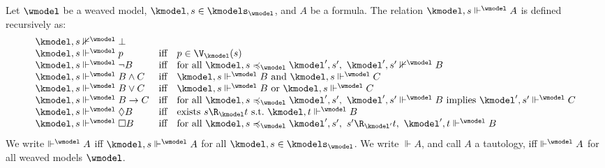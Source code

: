 {

\begin{definition}\label{def:sat:wmodel:simulation}
  Let $\wmodel$ be a weaved model, $\kmodel,s \in \kmodels_{\wmodel}$, and $A$ be a formula.
  The relation $\kmodel, s \Vdash^{\wmodel} A$ is defined recursively as:
  \[\begin{array}{lcl}
    \kmodel, s \nVdash^{\wmodel} \bot \\
    \kmodel, s \Vdash^{\wmodel} p & \text{iff} & p \in \V_{\kmodel}(s) \\
    \kmodel, s \Vdash^{\wmodel} \lnot B & \text{iff} & \text{for all } \kmodel,s \preccurlyeq_{\wmodel} \kmodel',s',~ \kmodel', s' \nVdash^{\wmodel} B \\
    \kmodel, s \Vdash^{\wmodel} B \land C & \text{iff} & \kmodel, s \Vdash^{\wmodel} B \text{ and } \kmodel, s \Vdash^{\wmodel} C \\
    \kmodel, s \Vdash^{\wmodel} B \lor C & \text{iff} & \kmodel, s \Vdash^{\wmodel} B \text{ or } \kmodel, s \Vdash^{\wmodel} C \\
    \kmodel, s \Vdash^{\wmodel} B \to C & \text{iff} & \text{for all } \kmodel,s \preccurlyeq_{\wmodel} \kmodel',s',~ \kmodel', s' \Vdash^{\wmodel} B \text{ implies } \kmodel', s' \Vdash^{\wmodel} C \\
    \kmodel, s \Vdash^{\wmodel} \Diamond B & \text{iff} & \text{exists } s \R_{\kmodel} t \text{ s.t.\ } \kmodel, t \Vdash^{\wmodel} B \\
    \kmodel, s \Vdash^{\wmodel} \Box B & \text{iff} & \text{for all } \kmodel,s \preccurlyeq_{\wmodel} \kmodel',s',~ s' \R_{\kmodel'} t,~ \kmodel', t \Vdash^{\wmodel} B
  \end{array}\]
  We write $\Vdash^{\wmodel} A$ iff $\kmodel,s \Vdash^{\wmodel} A$ for all $\kmodel,s \in \kmodels_{\wmodel}$.
  We write $\Vdash A$, and call $A$ a tautology, iff $\Vdash^{\wmodel} A$ for all weaved models $\wmodel$.
\end{definition}
}


